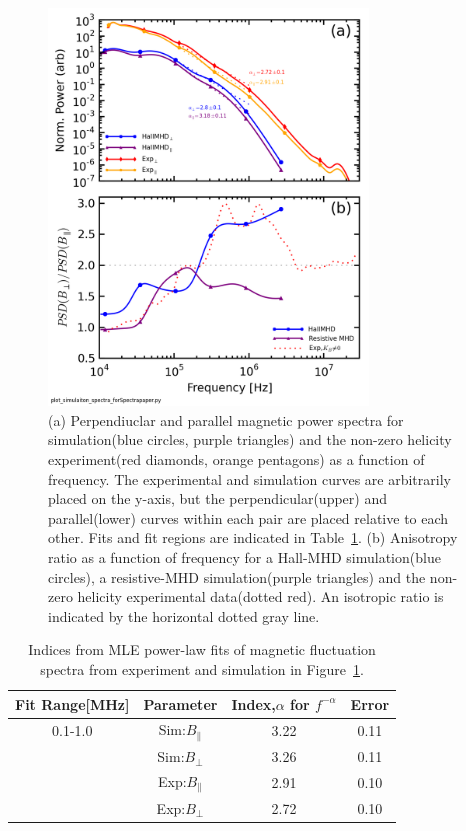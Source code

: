 \documentclass[aip,prl,amsmath,amssymb,reprint,superscriptaddress]{revtex4-1} %
\begin{document}
\begin{figure}[!htbp]
\centerline{
\includegraphics[width=8.5cm]{Anisotropy_simulation_comparison_with8radpos}}
\caption{\label{fig:aniso_comp} (a) Perpendiuclar and parallel magnetic power spectra for simulation(blue circles, purple triangles) and the non-zero helicity experiment(red diamonds, orange pentagons) as a function of frequency. The experimental and simulation curves are arbitrarily placed on the y-axis, but the perpendicular(upper) and parallel(lower) curves within each pair are placed relative to each other. Fits and fit regions are indicated in Table~\ref{tab:Simindices}. (b) Anisotropy ratio as a function of frequency for a Hall-MHD simulation(blue circles), a resistive-MHD simulation(purple triangles) and the non-zero helicity experimental data(dotted red). An isotropic ratio is indicated by the horizontal dotted gray line.}
\end{figure}

\begin{table}
\caption{\label{tab:Simindices}Indices from MLE power-law fits of magnetic fluctuation spectra from experiment and simulation in Figure~\ref{fig:aniso_comp}.}
\begin{tabular}{cccc}
\toprule
Fit Range[MHz]	&	Parameter						&	Index,$\alpha$ for $f^{-\alpha}$	&Error\\
\hline
0.1-1.0					& Sim:$B_{\parallel}$	& 3.22	&0.11\\
								& Sim:$B_{\perp}$			& 3.26  &0.11\\
								& Exp:$B_{\parallel}$	& 2.91	&0.10\\
								& Exp:$B_{\perp}$			& 2.72  &0.10\\
\hline
\end{tabular}
\end{table}
\end{document}
